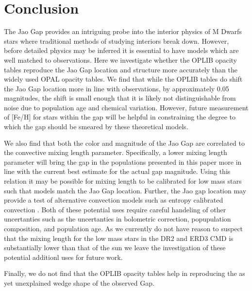 \section{Conclusion}\label{sec:conclusion}
%
%
The Jao Gap provides an intriguing probe into the interior physics of M Dwarfs
stars where traditional methods of studying interiors break down. However,
before detailed physics may be inferred it is essential to have models which
are well matched to observations. Here we investigate whether the OPLIB opacity
tables reproduce the Jao Gap location and structure more accurately than the
widely used OPAL opacity tables. We find that while the OPLIB tables do shift
the Jao Gap location more in line with observations, by approximately 0.05
magnitudes, the shift is small enough that it is likely not distinguishable
from noise due to population age and chemical variation. However, future
measurement of [Fe/H] for stars within the gap will be helpful in constraining
the degree to which the gap should be smeared by these theoretical models.

We also find that both the color and magnitude of the Jao Gap are
correlated to the convective mixing length parameter. Specifically, a lower
mixing length parameter will bring the gap in the populations presented in this
paper more in line with the current best estimate for the actual gap magnitude.
Using this relation it may be possible for mixing length to be calibrated for
low mass stars such that models match the Jao Gap location. Further, the Jao
gap location may provide a test of alternative convection models such as
entropy calibrated convection \citep{Spada2021}. Both of these potential uses
require careful handeling of other uncertanties such as the uncertanties in
bolometric correction, popupulation composition, and population age. As we
currently do not have reason to suspect that the mixing length for the low mass
stars in the DR2 and ERD3 CMD is substantially lower than that of the sun we
leave the investigation of these potential additionl uses for future work.

Finally, we do not find that the OPLIB opacity tables help in reproducing the
as yet unexplained wedge shape of the observed Gap.
